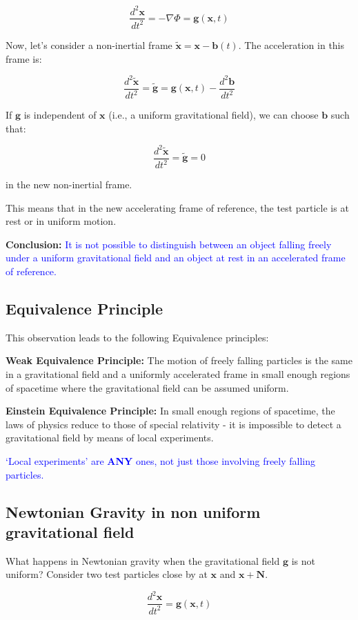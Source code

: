 \documentclass{article}
\newcommand\note[1]{\textcolor{blue}{#1}}
\begin{document}
$$\frac{d^2\mathbf{x}}{dt^2} = -\nabla\Phi = \mathbf{g}(\mathbf{x},t)$$


Now, let's consider a non-inertial frame $\tilde{\mathbf{x}} = \mathbf{x} - \mathbf{b}(t)$. The acceleration in this frame is:


$$\frac{d^2\tilde{\mathbf{x}}}{dt^2} = \tilde{\mathbf{g}} = \mathbf{g}(\mathbf{x},t) - \frac{d^2\mathbf{b}}{dt^2}$$


If $\mathbf{g}$ is independent of $\mathbf{x}$ (i.e., a uniform gravitational field), we can choose $\mathbf{b}$ such that:


$$\frac{d^2\tilde{\mathbf{x}}}{dt^2} = \tilde{\mathbf{g}} = 0$$


in the new non-inertial frame.


This means that in the new accelerating frame of reference, the test particle is at rest or in uniform motion.


\textbf{Conclusion:} \note{It is not possible to distinguish between an object falling freely under a uniform gravitational field and an object at rest in an accelerated frame of reference.}
\subsection{Equivalence Principle}
This observation leads to the following Equivalence principles:


\textbf{Weak Equivalence Principle:} The motion of freely falling particles is the same in a gravitational field and a uniformly accelerated frame in small enough regions of spacetime where the gravitational field can be assumed uniform.


\textbf{Einstein Equivalence Principle:} In small enough regions of spacetime, the laws of physics reduce to those of special relativity - it is impossible to detect a gravitational field by means of local experiments.


\note{`Local experiments' are \textbf{ANY} ones, not just those involving freely falling particles.
}
\subsection{Newtonian Gravity in non uniform gravitational field}
What happens in Newtonian gravity when the gravitational field $\mathbf{g}$ is not uniform? Consider two test particles close by at $\mathbf{x}$ and $\mathbf{x} + \mathbf{N}$.


$$\frac{d^2\mathbf{x}}{dt^2} = \mathbf{g}(\mathbf{x},t)$$
\end{document}
